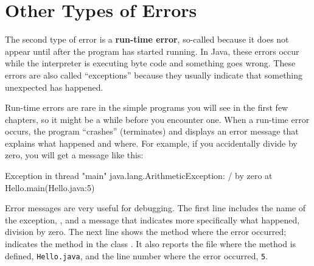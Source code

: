 \section{Other Types of Errors}
\label{exception}


The second type of error is a {\bf run-time error}, so-called because it does not appear until after the program has started running.
In Java, these errors occur while the interpreter is executing byte code and something goes wrong.
These errors are also called ``exceptions'' because they usually indicate that something unexpected has happened.

Run-time errors are rare in the simple programs you will see in the first few chapters, so it might be a while before you encounter one.
When a run-time error occurs, the program ``crashes'' (terminates) and displays an error message that explains what happened and where.
For example, if you accidentally divide by zero, you will get a message like this:

\begin{small}
\begin{stdout}
Exception in thread "main" java.lang.ArithmeticException: / by zero
    at Hello.main(Hello.java:5)
\end{stdout}
\end{small}


Error messages are very useful for debugging.
The first line includes the name of the exception, , and a message that indicates more specifically what happened, division by zero.
The next line shows the method where the error occurred;  indicates the method  in the class .
It also reports the file where the method is defined, {\tt Hello.java}, and the line number where the error occurred, {\tt 5}.



